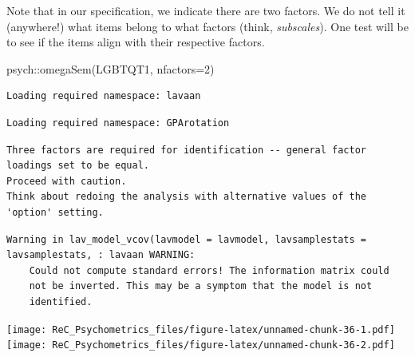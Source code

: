 \documentclass[
  english,
]{book}
\newenvironment{Shaded}{\begin{snugshade}}{\end{snugshade}}
\newcommand{\AttributeTok}[1]{\textcolor[rgb]{0.77,0.63,0.00}{#1}}
\newcommand{\DecValTok}[1]{\textcolor[rgb]{0.00,0.00,0.81}{#1}}
\newcommand{\FunctionTok}[1]{\textcolor[rgb]{0.00,0.00,0.00}{#1}}
\newcommand{\NormalTok}[1]{#1}
\newcommand{\SpecialCharTok}[1]{\textcolor[rgb]{0.00,0.00,0.00}{#1}}
\begin{document}
Note that in our specification, we indicate there are two factors. We do not tell it (anywhere!) what items belong to what factors (think, \emph{subscales}). One test will be to see if the items align with their respective factors.

\begin{Shaded}
\begin{Highlighting}[]
\NormalTok{psych}\SpecialCharTok{::}\FunctionTok{omegaSem}\NormalTok{(LGBTQT1, }\AttributeTok{nfactors=}\DecValTok{2}\NormalTok{)}
\end{Highlighting}
\end{Shaded}

\begin{verbatim}
Loading required namespace: lavaan
\end{verbatim}

\begin{verbatim}
Loading required namespace: GPArotation
\end{verbatim}

\begin{verbatim}
Three factors are required for identification -- general factor loadings set to be equal. 
Proceed with caution. 
Think about redoing the analysis with alternative values of the 'option' setting.
\end{verbatim}

\begin{verbatim}
Warning in lav_model_vcov(lavmodel = lavmodel, lavsamplestats = lavsamplestats, : lavaan WARNING:
    Could not compute standard errors! The information matrix could
    not be inverted. This may be a symptom that the model is not
    identified.
\end{verbatim}

\texttt{[image: ReC\_Psychometrics\_files/figure-latex/unnamed-chunk-36-1.pdf]} \texttt{[image: ReC\_Psychometrics\_files/figure-latex/unnamed-chunk-36-2.pdf]}
\end{document}
